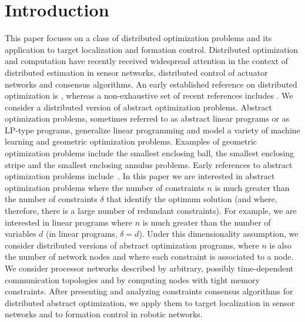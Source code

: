 \documentclass[onecolumn,journal,letterpaper]{IEEEtran}
\begin{document}
\section{Introduction}
This paper focuses on a class of distributed optimization problems and its
application to target localization and formation control.
Distributed optimization and computation have recently received widespread
attention in the context of distributed estimation in sensor networks,
distributed control of actuator networks and consensus algorithms. An early
established reference on distributed optimization is \cite{JNT-DPB-MA:86},
whereas a non-exhaustive set of recent references includes
\cite{NM-AJ:09,AN-AO-PAP:09,BJ-AS-MK-KHJ:08,DPP-MC:07}.
We consider a distributed version of abstract optimization problems.
Abstract optimization problems, sometimes referred to as abstract linear
programs or as LP-type programs, generalize linear programming and model a
variety of machine learning and geometric optimization problems. Examples
of geometric optimization problems include the smallest enclosing ball, the
smallest enclosing stripe and the smallest enclosing annulus problems.
Early references to abstract optimization problems
include~\cite{JM-MS-EW:96,BG:95,MG:95}.
In this paper we are interested in abstract optimization problems where the
number of constraints $n$ is much greater than the number of constraints
$\delta$ that identify the optimum solution (and where, therefore, there is
a large number of redundant constraints). For example, we are interested in
linear programs where $n$ is much greater than the number of variables $d$
(in linear programs, $\delta=d$). Under this dimensionality assumption,
we consider distributed versions of abstract optimization programs, where
$n$ is also the number of network nodes and where each constraint is
associated to a node. We consider processor networks described by
arbitrary, possibly time-dependent communication topologies and by
computing nodes with tight memory constraints. After presenting and
analyzing constraints consensus algorithms for distributed abstract
optimization, we apply them to target localization in sensor networks and
to formation control in robotic networks.
\end{document}

